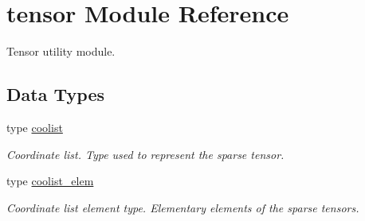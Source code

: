 \hypertarget{namespacetensor}{}\section{tensor Module Reference}
\label{namespacetensor}


Tensor utility module.  


\subsection*{Data Types}
\begin{DoxyCompactItemize}
\item 
type \hyperlink{structtensor_1_1coolist}{coolist}
\begin{DoxyCompactList}\small\item\em Coordinate list. Type used to represent the sparse tensor. \end{DoxyCompactList}\item 
type \hyperlink{structtensor_1_1coolist__elem}{coolist\+\_\+elem}
\begin{DoxyCompactList}\small\item\em Coordinate list element type. Elementary elements of the sparse tensors. \end{DoxyCompactList}\end{DoxyCompactItemize}
